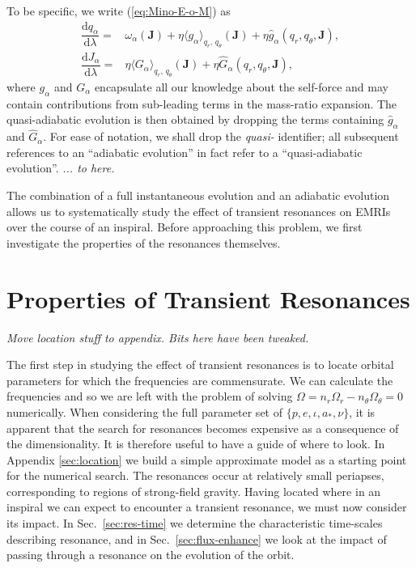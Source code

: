 \documentclass[aps,prd,amsfonts,amssymb,amsmath,nofootinbib,showpacs,superscriptaddress,twocolumn]{revtex4}
\newcommand{\eqnref}[1]{(\ref{eq:#1})}
\newcommand{\secref}[1]{Sec.\ \ref{sec:#1}}
\newcommand{\apref}[1]{Appendix \ref{sec:#1}}
\newcommand{\dd}{\ensuremath{\mathrm{d}}}
\newcommand{\diff}[2]{\ensuremath{\dfrac{\dd {#1}}{\dd {#2}}}}
\begin{document}
To be specific, we write \eqnref{Mino-E-o-M} as
\begin{subequations}
\begin{align}
\label{eq:Mino-E-o-M2}
\diff{q_\alpha}{\lambda} = {} & \omega_\alpha(\boldsymbol{J}) + \eta \langle g_\alpha\rangle_{q_r,\,q_\theta}(\boldsymbol{J}) + \eta \hat{g}_\alpha(q_r,q_\theta,\boldsymbol{J}), \\
\diff{J_\alpha}{\lambda} = {} & \eta \langle G_\alpha\rangle_{q_r,\,q_\theta}(\boldsymbol{J}) + \eta \hat{G}_\alpha(q_r,q_\theta,\boldsymbol{J}),
\end{align}
\end{subequations}
where $g_\alpha$ and $G_\alpha$ encapsulate all our knowledge about the self-force and may contain contributions from sub-leading terms in the mass-ratio expansion. The quasi-adiabatic evolution is then obtained by dropping the terms containing $\hat{g}_\alpha$ and $\hat{G}_\alpha$. For ease of notation, we shall drop the \emph{quasi-} identifier; all subsequent references to an ``adiabatic evolution'' in fact refer to a ``quasi-adiabatic evolution''.
\emph{... to here.}

The combination of a full instantaneous evolution and an adiabatic evolution allows us to systematically study the effect of transient resonances on EMRIs over the course of an inspiral. Before approaching this problem, we first investigate the properties of the resonances themselves.


\section{Properties of Transient Resonances}
\label{sec:properties}

\emph{Move location stuff to appendix. Bits here have been tweaked.}

The first step in studying the effect of transient resonances is to locate orbital parameters for which the frequencies are commensurate. We can calculate the frequencies and so we are left with the problem of solving $\Omega = n_r \Omega_r - n_\theta \Omega_\theta = 0$ numerically. When considering the full parameter set of $\{p,e,\iota,a_\ast,\nu\}$, it is apparent that the search for resonances becomes expensive as a consequence of the dimensionality. It is therefore useful to have a guide of where to look. In \apref{location} we build a simple approximate model as a starting point for the numerical search. The resonances occur at relatively small periapses, corresponding to regions of strong-field gravity. Having located where in an inspiral we can expect to encounter a transient resonance, we must now consider its impact. In \secref{res-time} we determine the characteristic time-scales describing resonance, and in \secref{flux-enhance} we look at the impact of passing through a resonance on the evolution of the orbit.
\end{document}

